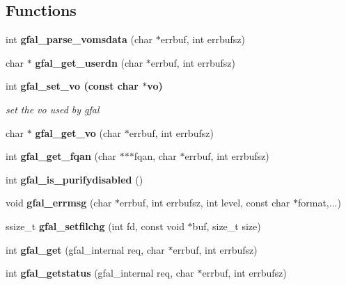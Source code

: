 \subsection*{Functions}
\begin{CompactItemize}
\item 
int \textbf{gfal\_\-parse\_\-vomsdata} (char $\ast$errbuf, int errbufsz)\label{gfal__common_8c_54942230ba2576538e1ad096332950b8}

\item 
char $\ast$ \textbf{gfal\_\-get\_\-userdn} (char $\ast$errbuf, int errbufsz)\label{group__internal__group_g6bd6336b0fee1ff32ad6bc5ef3d96068}

\item 
int \bf{gfal\_\-set\_\-vo} (const char $\ast$vo)\label{group__common__group_gcf4ae9045b7e5a2a697b1bb1f05994a8}

\begin{CompactList}\small\item\em set the vo used by gfal \item\end{CompactList}\item 
char $\ast$ \textbf{gfal\_\-get\_\-vo} (char $\ast$errbuf, int errbufsz)\label{group__internal__group_g1d7294ee456d16c8b1bf40f97ffb5081}

\item 
int \textbf{gfal\_\-get\_\-fqan} (char $\ast$$\ast$$\ast$fqan, char $\ast$errbuf, int errbufsz)\label{group__internal__group_g54b4e29078838583c8022630ef5a2ed3}

\item 
int \textbf{gfal\_\-is\_\-purifydisabled} ()\label{group__internal__group_g3a35f0e6f616c5108f95cfffd557db77}

\item 
void \textbf{gfal\_\-errmsg} (char $\ast$errbuf, int errbufsz, int level, const char $\ast$format,...)\label{gfal__common_8c_e6fb0cae56e9344c2b6ed23001f7dcb5}

\item 
ssize\_\-t \textbf{gfal\_\-setfilchg} (int fd, const void $\ast$buf, size\_\-t size)\label{group__posix__group_g45a23756f2c79a7e07488bb3fb2fc35e}

\item 
int \textbf{gfal\_\-get} (gfal\_\-internal req, char $\ast$errbuf, int errbufsz)\label{gfal__common_8c_95e09a3cfbab50249ecf2bca54b88274}

\item 
int \textbf{gfal\_\-getstatus} (gfal\_\-internal req, char $\ast$errbuf, int errbufsz)\label{gfal__common_8c_2665d19dee3b8ed312f27d97310dd21d}


\end{CompactItemize}
